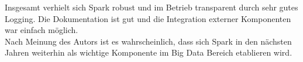 Insgesamt verhielt sich Spark robust und im Betrieb transparent durch sehr gutes Logging. Die Dokumentation ist gut und die Integration externer Komponenten war einfach möglich.\\

Nach Meinung des Autors ist es wahrscheinlich, dass sich Spark in den nächsten Jahren weiterhin als wichtige Komponente im Big Data Bereich etablieren wird.